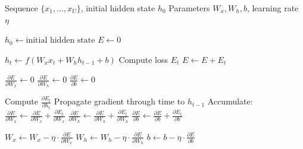 \begin{algorithm}[H]
    \caption*{RNN Unrolling over $U$ Time Steps (with BPTT)}
    \begin{algorithmic}[1]
        \Require Sequence $\{x_1, \dots, x_U\}$, initial hidden state $h_0$
        \Require Parameters $W_x, W_h, b$, learning rate $\eta$

        \State $h_0 \gets \text{initial hidden state}$
        \State $E \gets 0$

            \State $h_t \gets f(W_x x_t + W_h h_{t-1} + b)$
            \State Compute loss $E_t$
            \State $E \gets E + E_t$
        \EndFor

        \State $\frac{\partial E}{\partial W_x} \gets 0$
        \State $\frac{\partial E}{\partial W_h} \gets 0$
        \State $\frac{\partial E}{\partial b} \gets 0$

            \State Compute $\frac{\partial E_t}{\partial h_t}$
            \State Propagate gradient through time to $h_{t-1}$
            \State Accumulate:
            \State \hspace{1em} $\frac{\partial E}{\partial W_x} \gets \frac{\partial E}{\partial W_x} + \frac{\partial E_t}{\partial W_x}$
            \State \hspace{1em} $\frac{\partial E}{\partial W_h} \gets \frac{\partial E}{\partial W_h} + \frac{\partial E_t}{\partial W_h}$
            \State \hspace{1em} $\frac{\partial E}{\partial b} \gets \frac{\partial E}{\partial b} + \frac{\partial E_t}{\partial b}$
        \EndFor

        \State $W_x \gets W_x - \eta \cdot \frac{\partial E}{\partial W_x}$
        \State $W_h \gets W_h - \eta \cdot \frac{\partial E}{\partial W_h}$
        \State $b \gets b - \eta \cdot \frac{\partial E}{\partial b}$
    \end{algorithmic}
\end{algorithm}

